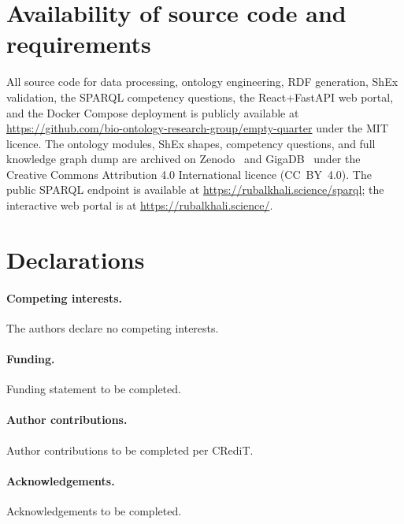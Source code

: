 \documentclass[11pt,a4paper]{article}
\begin{document}
\section{Availability of source code and requirements}\label{sec:availability}

All source code for data processing, ontology engineering, RDF
generation, ShEx validation, the SPARQL competency questions, the
React+FastAPI web portal, and the Docker Compose deployment is
publicly available at
\url{https://github.com/bio-ontology-research-group/empty-quarter}
under the MIT licence. The ontology modules, ShEx shapes, competency
questions, and full knowledge graph dump are archived on
Zenodo~\cite{zenodo_rak} and GigaDB~\cite{gigadb_rak} under the
Creative Commons Attribution 4.0 International licence
(CC~BY~4.0). The public SPARQL endpoint is available at
\url{https://rubalkhali.science/sparql}; the interactive web portal is
at \url{https://rubalkhali.science/}.

\section*{Declarations}

\paragraph{Competing interests.}
The authors declare no competing interests.

\paragraph{Funding.}
Funding statement to be completed.

\paragraph{Author contributions.}
Author contributions to be completed per CRediT.

\paragraph{Acknowledgements.}
Acknowledgements to be completed.



\end{document}
